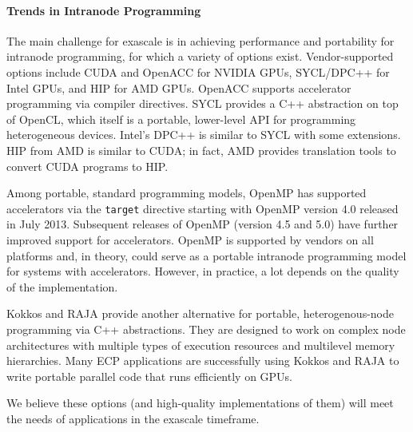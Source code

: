 \paragraph{Trends in Intranode Programming}
The main challenge for exascale is in achieving performance and portability for
intranode programming, for which a variety of options
exist. Vendor-supported options include CUDA and OpenACC for NVIDIA
GPUs, SYCL/DPC++ for Intel GPUs, and HIP for AMD GPUs. OpenACC
supports accelerator programming via compiler directives. SYCL
provides a C++ abstraction on top of OpenCL, which itself is a
portable, lower-level API for programming heterogeneous
devices. Intel's DPC++ is similar to SYCL with some extensions. HIP
from AMD is similar to CUDA; in fact, AMD provides translation tools
to convert CUDA programs to HIP.

Among portable, standard programming models, OpenMP has supported
accelerators via the \texttt{target} directive starting with OpenMP version
4.0 released in July 2013. Subsequent releases of OpenMP (version 4.5
and 5.0) have further improved support for accelerators. OpenMP is
supported by vendors on all platforms and, in theory, could serve as a
portable intranode programming model for systems with
accelerators. However, in practice, a lot depends on the quality of
the implementation.

Kokkos and RAJA provide another alternative for portable,
heterogenous-node programming via C++ abstractions. They
are designed to work on complex node architectures
with multiple types of execution resources and multilevel memory
hierarchies. Many ECP applications are successfully using Kokkos and
RAJA to write portable parallel code that runs efficiently on GPUs.

We believe these options (and high-quality implementations of them) will
meet the needs of applications in the exascale timeframe. 
